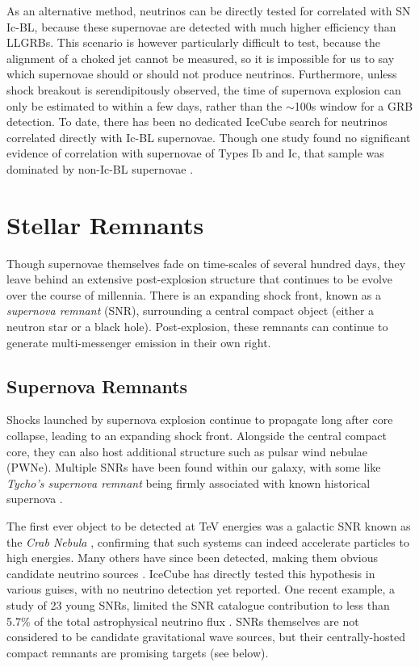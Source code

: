 As an alternative method, neutrinos can be directly tested for correlated with SN Ic-BL, because these supernovae are detected with much higher efficiency than LLGRBs. This scenario is however particularly difficult to test, because the alignment of a choked jet cannot be measured, so it is impossible for us to say which supernovae should or should not produce neutrinos. Furthermore, unless shock breakout is serendipitously observed, the time of supernova explosion can only be estimated to within a few days, rather than the $\sim$100s window for a GRB detection. To date, there has been no dedicated IceCube search for neutrinos correlated directly with Ic-BL supernovae. Though one study found no significant evidence of correlation with supernovae of Types Ib and Ic, that sample was dominated by non-Ic-BL supernovae \cite{Stasik2018Search}. 

\section{Stellar Remnants}

Though supernovae themselves fade on time-scales of several hundred days, they leave behind an extensive post-explosion structure that continues to be evolve over the course of millennia. There is an expanding shock front, known as a \emph{supernova remnant} (SNR), surrounding a central compact object (either a neutron star or a black hole). Post-explosion, these remnants can continue to generate multi-messenger emission in their own right.

\subsection*{Supernova Remnants}

Shocks launched by supernova explosion continue to propagate long after core collapse, leading to an expanding shock front. Alongside the central compact core, they can also host additional structure such as pulsar wind nebulae (PWNe). Multiple SNRs have been found within our galaxy, with some like \emph{Tycho's supernova remnant} being firmly associated with known historical supernova .

The first ever object to be detected at TeV energies was a galactic SNR known as the \emph{Crab Nebula} , confirming that such systems can indeed accelerate particles to high energies. Many others have since been detected, making them obvious candidate neutrino sources . IceCube has directly tested this hypothesis in various guises, with no neutrino detection yet reported. One recent example, a study of 23 young SNRs, limited the SNR catalogue contribution to less than 5.7\% of the total astrophysical neutrino flux \cite{ic_17_galactic}. SNRs themselves are not considered to be candidate gravitational wave sources, but their centrally-hosted compact remnants are promising targets (see below).

